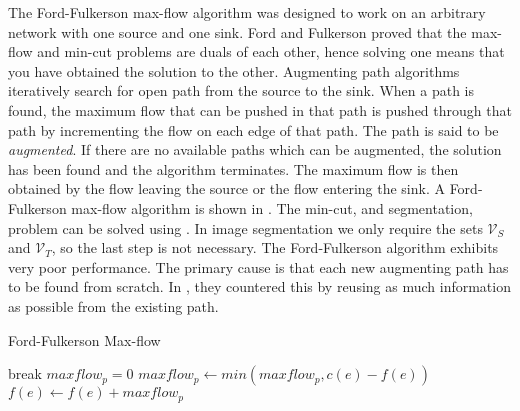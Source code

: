 The Ford-Fulkerson max-flow algorithm \citep{Ford1956} was designed to work on an arbitrary network with one source and one sink. Ford and Fulkerson proved that the max-flow and min-cut problems are duals of each other, hence solving one means that you have obtained the solution to the other. Augmenting path algorithms iteratively search for open path from the source to the sink. When a path is found, the maximum flow that can be pushed in that path is pushed through that path by incrementing the flow on each edge of that path. The path is said to be \textit{augmented}. If there are no available paths which can be augmented, the solution has been found and the algorithm terminates. The maximum flow is then obtained by the flow leaving the source or the flow entering the sink. A Ford-Fulkerson max-flow algorithm is shown in . The min-cut, and segmentation, problem can be solved using . In image segmentation we only require the sets $\mathcal{V}_S$ and $\mathcal{V}_T$, so the last step is not necessary. The Ford-Fulkerson algorithm exhibits very poor performance. The primary cause is that each new augmenting path has to be found from scratch. In \citep{Boykvo2001_3}, they countered this by reusing as much information as possible from the existing path.

\begin{algorithm}[!t]
	\caption{Ford-Fulkerson Max-flow}\label{alg:fordfulkerson}
	\begin{algorithmic}[1]
					\State break
				\EndIf
				\newline
				\State $maxflow_p = 0$
					\State $maxflow_p \gets min(maxflow_p,c(e)-f(e))$
				\EndFor
				\newline
					\State $f(e) \gets f(e) + maxflow_p$
				\EndFor
			\EndWhile\label{fordfulkersonwhile}
		\EndProcedure
	\end{algorithmic}
\end{algorithm}


